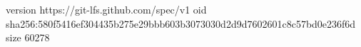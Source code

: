 version https://git-lfs.github.com/spec/v1
oid sha256:580f5416ef304435b275e29bbb603b3073030d2d9d7602601c8c57bd0e236f6d
size 60278
